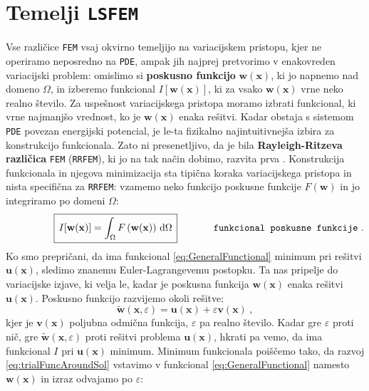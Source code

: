 \section{Temelji \texttt{LSFEM}}

Vse različice \texttt{FEM} vsaj okvirno temeljijo na variacijskem pristopu, kjer ne operiramo neposredno na \texttt{PDE}, ampak jih najprej pretvorimo v enakovreden variacijski problem: omislimo si \textbf{poskusno funkcijo} $\mathbf{w}(\mathbf{x})$, ki jo napnemo nad domeno $\Omega$, in izberemo funkcional $I[\mathbf{w}(\mathbf{x})]$, ki za vsako $\mathbf{w}(\mathbf{x})$ vrne neko realno število. Za uspešnost variacijskega pristopa moramo izbrati funkcional, ki vrne najmanjšo vrednost, ko je $\mathbf{w}(\mathbf{x})$ enaka rešitvi. Kadar obstaja s sistemom \texttt{PDE} povezan energijski potencial, je le-ta fizikalno najintuitivnejša izbira za konstrukcijo funkcionala. Zato ni presenetljivo, da je bila \textbf{Rayleigh-Ritzeva različica} \texttt{FEM} (\texttt{RRFEM}), ki jo na tak način dobimo, razvita prva \cite{RitzW-Variationsprobleme}. Konstrukcija funkcionala in njegova minimizacija sta tipična koraka variacijskega pristopa in nista specifična za \texttt{RRFEM}: vzamemo neko funkcijo poskusne funkcije $F\left(\mathbf{w}\right)$ in jo integriramo po domeni $\Omega$:
\begin{equation}
	\hspace{17mm} \boxed{\, I[\mathbf{w(x)}] = \int_{\Omega} F\left(\mathbf{w(x)}\right) \, \ud \Omega \,} \hspace{13mm} \texttt{funkcional poskusne funkcije} \ .
	\label{eq:GeneralFunctional}
\end{equation}
Ko smo prepričani, da ima funkcional \eqref{eq:GeneralFunctional} minimum pri rešitvi $\mathbf{u}(\mathbf{x})$, sledimo znanemu Euler-Lagrange\-ve\-mu postopku. Ta nas pripelje do variacijske izjave, ki velja le, kadar je poskusna funkcija $\mathbf{w}(\mathbf{x})$ enaka rešitvi $\mathbf{u}(\mathbf{x})$. Poskusno funkcijo razvijemo okoli rešitve:
\begin{equation}
	\widetilde{\mathbf{w}}(\mathbf{x}, \varepsilon) = \mathbf{u}(\mathbf{x}) + \varepsilon \mathbf{v}(\mathbf{x}) \ ,
	\label{eq:trialFuncAroundSol}
\end{equation}
kjer je $\mathbf{v}(\mathbf{x})$ poljubna odmična funkcija, $\varepsilon$ pa realno število. Kadar gre $\varepsilon$ proti nič, gre $\widetilde{\mathbf{w}}(\mathbf{x}, \varepsilon)$ proti rešitvi problema $\mathbf{u}(\mathbf{x})$, hkrati pa vemo, da ima funkcional $I$ pri $\mathbf{u}(\mathbf{x})$ minimum. Minimum funkcionala poiščemo tako, da razvoj \eqref{eq:trialFuncAroundSol} vstavimo v funkcional \eqref{eq:GeneralFunctional} namesto $\mathbf{w}(\mathbf{x})$ in izraz odvajamo po $\varepsilon$:
